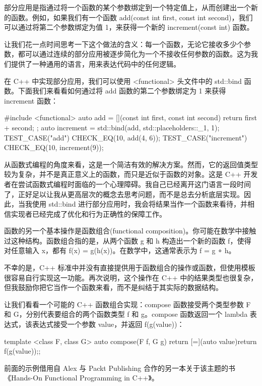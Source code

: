 部分应用是指通过将一个函数的某个参数绑定到一个特定值上，从而创建出一个新的函数。例如，如果我们有一个函数 add(const int first, const int second)，我们可以通过将第二个参数绑定为值 1，来获得一个新的 increment(const int) 函数。

让我们花一点时间思考一下这个做法的含义：每一个函数，无论它接收多少个参数，都可以通过连续的部分应用被逐步简化为一个不接收任何参数的函数。这为我们提供了一种通用的语言，用来表达代码中的任何逻辑。

在 C++ 中实现部分应用，我们可以使用 <functional> 头文件中的 std::bind 函数。下面我们来看看如何通过将 add 函数的第二个参数绑定为 1 来获得 increment 函数：

\begin{cpp}
#include <functional>
auto add = [](const int first, const int second){ return first +
second; };
auto increment = std::bind(add, std::placeholders::_1, 1);
TEST_CASE("add"){
  CHECK_EQ(10, add(4, 6));
}
TEST_CASE("increment"){
  CHECK_EQ(10, increment(9));
}
\end{cpp}

从函数式编程的角度来看，这是一个简洁有效的解决方案。然而，它的返回值类型较为复杂，并不是真正意义上的函数，而只是近似于函数的对象。这是 C++ 开发者在尝试函数式编程时面临的一个心理障碍。我自己已经离开这门语言一段时间了，正好足以让我从更高层次的概念去思考问题，而不是总去分析底层实现。因此，当我使用 std::bind 进行部分应用时，我会将结果当作一个函数来看待，并相信实现者已经完成了优化和行为正确性的保障工作。

函数的另一个基本操作是函数组合(functional composition)。你可能在数学中接触过这种结构。函数组合指的是，从两个函数 g 和 h 构造出一个新的函数 f，使得对任意输入 x，都有 f(x) = g(h(x))。在数学中，这通常表示为 f = g ∘ h。

不幸的是，C++ 标准中并没有直接提供用于函数组合的操作或函数，但使用模板很容易自行实现这一功能。再次说明，这个操作在 C++ 中的结果类型也很复杂，但我鼓励你把它当作一个函数来看，而不是纠结于其实际的数据结构。

让我们看看一个可能的 C++ 函数组合实现：compose 函数接受两个类型参数 F 和 G，分别代表要组合的两个函数类型 f 和 g。compose 函数返回一个 lambda 表达式，该表达式接受一个参数 value，并返回 f(g(value))：

\begin{cpp}
template <class F, class G>
auto compose(F f, G g){
return [=](auto value){return f(g(value));};
}
\end{cpp}

\begin{myTip}{}
前面的示例借用自 Alex 与 Packt Publishing 合作的另一本关于该主题的书 《Hands-On Functional Programming in C++》。
\end{myTip}

